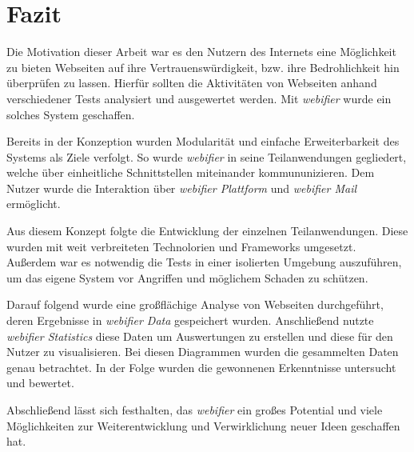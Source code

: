\chapter{Fazit}

Die Motivation dieser Arbeit war es den Nutzern des Internets eine Möglichkeit zu bieten Webseiten
auf ihre Vertrauenswürdigkeit, bzw. ihre Bedrohlichkeit hin überprüfen zu lassen. Hierfür sollten
die Aktivitäten von Webseiten anhand verschiedener Tests analysiert und ausgewertet werden. Mit
\textit{webifier} wurde ein solches System geschaffen.

Bereits in der Konzeption wurden Modularität und einfache Erweiterbarkeit des Systems als Ziele
verfolgt. So wurde \textit{webifier} in seine Teilanwendungen gegliedert, welche über einheitliche
Schnittstellen miteinander kommununizieren. Dem Nutzer wurde die Interaktion über \textit{webifier Plattform} und
\textit{webifier Mail} ermöglicht.

Aus diesem Konzept folgte die Entwicklung der einzelnen Teilanwendungen. Diese wurden mit weit
verbreiteten Technolorien und Frameworks umgesetzt. Außerdem war es notwendig die Tests in einer
isolierten Umgebung auszuführen, um das eigene System vor Angriffen und möglichem Schaden zu
schützen.

Darauf folgend wurde eine großflächige Analyse von Webseiten durchgeführt, deren Ergebnisse in
\textit{webifier Data} gespeichert wurden. Anschließend nutzte \textit{webifier Statistics} diese Daten um
Auswertungen zu erstellen und diese für den Nutzer zu visualisieren. Bei diesen Diagrammen wurden
die gesammelten Daten genau betrachtet. In der Folge wurden die gewonnenen Erkenntnisse
untersucht und bewertet.

Abschließend lässt sich festhalten, das \textit{webifier} ein großes Potential und viele Möglichkeiten zur
Weiterentwicklung und Verwirklichung neuer Ideen geschaffen hat.